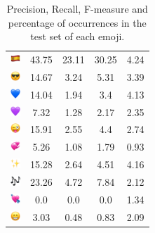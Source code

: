 \documentclass{article}
\begin{document}
\begin{table}
\begin{tabular}{|c|ccc|c|}
\includegraphics[height=0.37cm,width=0.37cm]{img/Spain.png} & 43.75 & 23.11 & 30.25 & 4.24\\ 
\includegraphics[height=0.37cm,width=0.37cm]{img/smiling_face_with_sunglasses.png} & 14.67 & 3.24 & 5.31 & 3.39\\ 
\includegraphics[height=0.37cm,width=0.37cm]{img/blue_heart.png} & 14.04 & 1.94 & 3.4 & 4.13\\ 
\includegraphics[height=0.37cm,width=0.37cm]{img/purple_heart.png} & 7.32 & 1.28 & 2.17 & 2.35\\ 
\includegraphics[height=0.37cm,width=0.37cm]{img/winking_face_with_tongue.png} & 15.91 & 2.55 & 4.4 & 2.74\\ 
\includegraphics[height=0.37cm,width=0.37cm]{img/revolving_hearts.png} & 5.26 & 1.08 & 1.79 & 0.93\\ 
\includegraphics[height=0.37cm,width=0.37cm]{img/sparkles.png} & 15.28 & 2.64 & 4.51 & 4.16\\ 
\includegraphics[height=0.37cm,width=0.37cm]{img/musical_notes.png} & 23.26 & 4.72 & 7.84 & 2.12\\ 
\includegraphics[height=0.37cm,width=0.37cm]{img/heart_with_arrow.png} & 0.0 & 0.0 & 0.0 & 1.34\\ 
\includegraphics[height=0.37cm,width=0.37cm]{img/beaming_face_with_smiling_eyes.png} & 3.03 & 0.48 & 0.83 & 2.09\\ 

\hline
\end{tabular}
\caption{\label{table:emoji_detailed} Precision, Recall, F-measure and percentage of occurrences in the test set of each emoji.}
\end{table}
\end{document}
